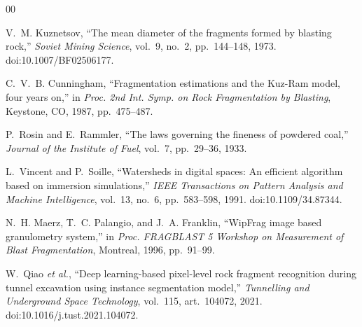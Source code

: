 \documentclass[journal]{IEEEtran}
\begin{document}
\begin{thebibliography}{00}

 V.~M. Kuznetsov, ``The mean diameter of the fragments formed by blasting rock,'' \emph{Soviet
Mining Science}, vol.~9, no.~2, pp.~144--148, 1973. doi:10.1007/BF02506177.

 C.~V.~B. Cunningham, ``Fragmentation estimations and the Kuz-Ram model, four years on,'' in
\emph{Proc. 2nd Int. Symp. on Rock Fragmentation by Blasting}, Keystone, CO, 1987, pp.~475--487.

 P.~Rosin and E.~Rammler, ``The laws governing the fineness of powdered coal,'' \emph{Journal of
the Institute of Fuel}, vol.~7, pp.~29--36, 1933.

 L.~Vincent and P.~Soille, ``Watersheds in digital spaces: An efficient algorithm based on
immersion simulations,'' \emph{IEEE Transactions on Pattern Analysis and Machine Intelligence}, vol.~13, no.~6,
pp.~583--598, 1991. doi:10.1109/34.87344.

 N.~H. Maerz, T.~C. Palangio, and J.~A. Franklin, ``WipFrag image based granulometry system,'' in
\emph{Proc. FRAGBLAST 5 Workshop on Measurement of Blast Fragmentation}, Montreal, 1996, pp.~91--99.

 W.~Qiao \emph{et al.}, ``Deep learning-based pixel-level rock fragment recognition during tunnel
excavation using instance segmentation model,'' \emph{Tunnelling and Underground Space Technology}, vol.~115,
art.~104072, 2021. doi:10.1016/j.tust.2021.104072.

\end{thebibliography}
\end{document}
